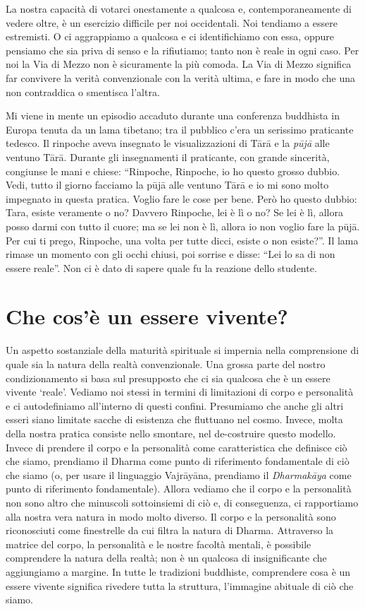 La nostra capacità di votarci onestamente a qualcosa e, contemporaneamente di vedere oltre, è un esercizio difficile per noi occidentali. Noi tendiamo a essere estremisti. O ci aggrappiamo a qualcosa e ci identifichiamo con essa, oppure pensiamo che sia priva di senso e la rifiutiamo; tanto non è reale in ogni caso. Per noi la Via di Mezzo non è sicuramente la più comoda. La Via di Mezzo significa far convivere la verità convenzionale con la verità ultima, e fare in modo che una non contraddica o smentisca l'altra.

Mi viene in mente un episodio accaduto durante una conferenza buddhista in Europa tenuta da un lama tibetano; tra il pubblico c'era un serissimo praticante tedesco. Il rinpoche aveva insegnato le visualizzazioni di Tārā e la \textit{pūjā} alle ventuno Tārā. Durante gli insegnamenti il praticante, con grande sincerità, congiunse le mani e chiese: ``Rinpoche, Rinpoche, io ho questo grosso dubbio. Vedi, tutto il giorno facciamo la pūjā alle ventuno Tārā e io mi sono molto impegnato in questa pratica. Voglio fare le cose per bene. Però ho questo dubbio: Tara, esiste veramente o no? Davvero Rinpoche, lei è lì o no? Se lei è lì, allora posso darmi con tutto il cuore; ma se lei non è lì, allora io non voglio fare la pūjā. Per cui ti prego, Rinpoche, una volta per tutte dicci, esiste o non esiste?''. Il lama rimase un momento con gli occhi chiusi, poi sorrise e disse: ``Lei lo sa di non essere reale''. Non ci è dato di sapere quale fu la reazione dello studente.

\section*{Che cos'\`e un essere vivente?}

Un aspetto sostanziale della maturità spirituale si impernia nella comprensione di quale sia la natura della realtà convenzionale. Una grossa parte del nostro condizionamento si basa sul presupposto che ci sia qualcosa che è un essere vivente `reale'. Vediamo noi stessi in termini di limitazioni di corpo e personalità e ci autodefiniamo all'interno di questi confini. Presumiamo che anche gli altri esseri siano limitate sacche di esistenza che fluttuano nel cosmo. Invece, molta della nostra pratica consiste nello smontare, nel de-costruire questo modello. Invece di prendere il corpo e la personalità come caratteristica che definisce ciò che siamo, prendiamo il Dharma come punto di riferimento fondamentale di ciò che siamo (o, per usare il linguaggio Vajrāyāna, prendiamo il \textit{Dharmakāya} come punto di riferimento fondamentale). Allora vediamo che il corpo e la personalità non sono altro che minuscoli sottoinsiemi di ciò e, di conseguenza, ci rapportiamo alla nostra vera natura in modo molto diverso. Il corpo e la personalità sono riconosciuti come finestrelle da cui filtra la natura di Dharma. Attraverso la matrice del corpo, la personalità e le nostre facoltà mentali, è possibile comprendere la natura della realtà; non è un qualcosa di insignificante che aggiungiamo a margine. In tutte le tradizioni buddhiste, comprendere cosa è un essere vivente significa rivedere tutta la struttura, l'immagine abituale di ciò che siamo.

